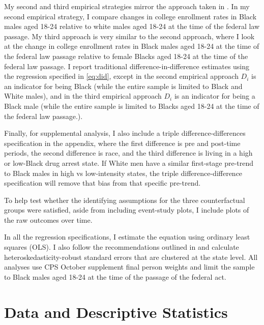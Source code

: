 \documentclass{article}
\begin{document}
My second and third empirical strategies mirror the approach taken in \cite {britton2022}. In my second empirical strategy, I compare changes in college enrollment rates in Black males aged 18-24 relative to white males aged 18-24 at the time of the federal law passage. My third approach is very similar to the second approach, where I look at the change in college enrollment rates in Black males aged 18-24 at the time of the federal law passage relative to female Blacks aged 18-24 at the time of the federal law passage. I report traditional difference-in-difference estimates using the regression specified in \ref{eq:did}, except in the second empirical approach $D_i$ is an indicator for being Black (while the entire sample is limited to Black and White males), and in the third empirical approach $D_i$ is an indicator for being a Black male (while the entire sample is limited to Blacks aged 18-24 at the time of the federal law passage.).

Finally, for supplemental analysis, I also include a triple difference-differences specification in the appendix, where the first difference is pre and post-time periods, the second difference is race, and the third difference is living in a high or low-Black drug arrest state. If White men have a similar first-stage pre-trend to Black males in high vs low-intensity states, the triple difference-difference specification will remove that bias from that specific pre-trend.

To help test whether the identifying assumptions for the three counterfactual groups were satisfied, aside from including event-study plots, I include plots of the raw outcomes over time.

In all the regression specifications, I estimate the equation using ordinary least squares (OLS). I also follow the recommendations outlined in \cite{duflo_did} and calculate heteroskedasticity-robust standard errors that are clustered at the state level. All analyses use CPS October supplement final person weights and limit the sample to Black males aged 18-24 at the time of the passage of the federal act.

\section{Data and Descriptive Statistics}
\end{document}
